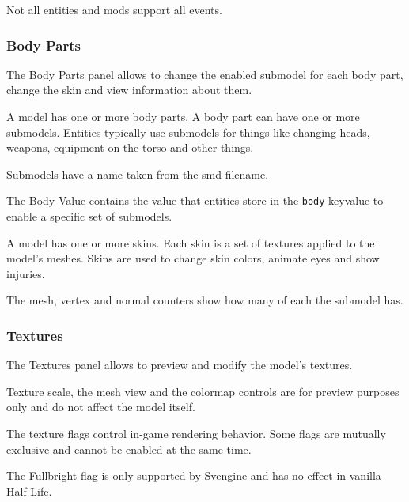 \documentclass[10pt, a4paper, titlepage, oneside]{article}
\newcommand{\code}[1]{\mbox{\texttt{#1}}}
\begin{document}
\vspace{\baselineskip}
Not all entities and mods support all events.

\subsubsection{Body Parts}

The Body Parts panel allows to change the enabled submodel for each body part, change the skin and view information about them.

\vspace{\baselineskip}
A model has one or more body parts. A body part can have one or more submodels. Entities typically use submodels for things like changing heads, weapons, equipment on the torso and other things.

\vspace{\baselineskip}
Submodels have a name taken from the smd filename.

\vspace{\baselineskip}
The Body Value contains the value that entities store in the \code{body} keyvalue to enable a specific set of submodels.

\vspace{\baselineskip}
A model has one or more skins. Each skin is a set of textures applied to the model's meshes. Skins are used to change skin colors, animate eyes and show injuries.

\vspace{\baselineskip}
The mesh, vertex and normal counters show how many of each the submodel has.

\newpage

\subsubsection{Textures}

The Textures panel allows to preview and modify the model's textures.

\vspace{\baselineskip}
Texture scale, the mesh view and the colormap controls are for preview purposes only and do not affect the model itself.

\vspace{\baselineskip}
The texture flags control in-game rendering behavior. Some flags are mutually exclusive and cannot be enabled at the same time.

\vspace{\baselineskip}
The Fullbright flag is only supported by Svengine and has no effect in vanilla Half-Life.
\end{document}
